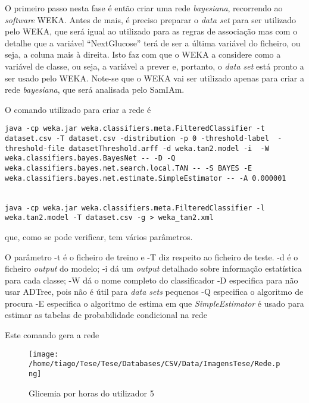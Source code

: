 O primeiro passo nesta fase é então criar uma rede \textit{bayesiana}, recorrendo ao \textit{software} WEKA. Antes de mais, é preciso preparar o \textit{data set} para ser utilizado pelo WEKA, que será igual ao utilizado para as regras de associação mas com o detalhe que a variável ``Next\textunderscore Glucose'' terá de ser a última variável do ficheiro, ou seja, a coluna mais à direita. Isto faz com que o WEKA a considere como a variável de classe, ou seja, a variável a prever e, portanto, o \textit{data set} está pronto a ser usado pelo WEKA. Note-se que o WEKA vai ser utilizado apenas para criar a rede \textit{bayesiana}, que será analisada pelo SamIAm.

O comando utilizado para criar a rede é

\begin{lstlisting}
java -cp weka.jar weka.classifiers.meta.FilteredClassifier -t dataset.csv -T dataset.csv -distribution -p 0 -threshold-label  -threshold-file datasetThreshold.arff -d weka.tan2.model -i  -W weka.classifiers.bayes.BayesNet -- -D -Q weka.classifiers.bayes.net.search.local.TAN -- -S BAYES -E weka.classifiers.bayes.net.estimate.SimpleEstimator -- -A 0.000001 


java -cp weka.jar weka.classifiers.meta.FilteredClassifier -l weka.tan2.model -T dataset.csv -g > weka_tan2.xml

\end{lstlisting}

que, como se pode verificar, tem vários parâmetros.

O parâmetro -t é o ficheiro de treino e -T diz respeito ao ficheiro de teste.
-d é o ficheiro \textit{output} do modelo;
-i dá um \textit{output} detalhado sobre informação estatística para cada classe;
-W dá o nome completo do classificador
-D especifica para não usar ADTree, pois não é útil para \textit{data sets} pequenos
-Q especifica o algoritmo de procura
-E especifica o algoritmo de estima em que \textit{SimpleEstimator} é usado para estimar as tabelas de probabilidade condicional na rede

Este comando gera a rede


\begin{figure}[H]
\centering
\texttt{[image: /home/tiago/Tese/Tese/Databases/CSV/Data/ImagensTese/Rede.png]}
\caption{Glicemia por horas do utilizador 5}
\end{figure}